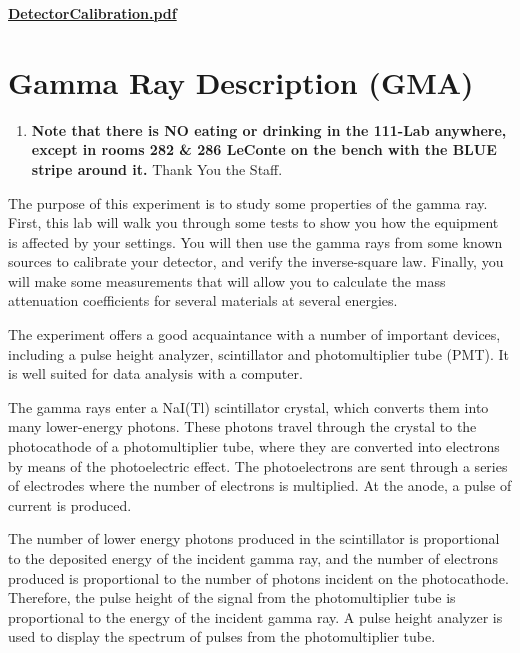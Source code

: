 \documentclass{../lab}
\begin{document}
\maketitle

\tableofcontents

\vspace{1em}

\href{https://berkeley-physics111b.github.io/assets/pdf/oldwebsitestructure/images/DetectorCalibration.pdf}{\textbf{DetectorCalibration.pdf}}

\section{Gamma Ray Description (GMA)}

\begin{enumerate}
    \item \textbf{Note that there is NO eating or drinking in the 111-Lab anywhere, except in rooms 282 \& 286 LeConte on the bench with the BLUE stripe around it.} Thank You the Staff.
\end{enumerate}

The purpose of this experiment is to study some properties of the gamma ray. First, this lab will walk you through some tests to show you how the equipment is affected by your settings. You will then use the gamma rays from some known sources to calibrate your detector, and verify the inverse-square law. Finally, you will make some measurements that will allow you to calculate the mass attenuation coefficients for several materials at several energies.

The experiment offers a good acquaintance with a number of important devices, including a pulse height analyzer, scintillator and photomultiplier tube (PMT). It is well suited for data analysis with a computer.

The gamma rays enter a NaI(Tl) scintillator crystal, which converts them into many lower-energy photons. These photons travel through the crystal to the photocathode of a photomultiplier tube, where they are converted into electrons by means of the photoelectric effect. The photoelectrons are sent through a series of electrodes where the number of electrons is multiplied. At the anode, a pulse of current is produced.

The number of lower energy photons produced in the scintillator is proportional to the deposited energy of the incident gamma ray, and the number of electrons produced is proportional to the number of photons incident on the photocathode. Therefore, the pulse height of the signal from the photomultiplier tube is proportional to the energy of the incident gamma ray. A pulse height analyzer is used to display the spectrum of pulses from the photomultiplier tube.
\end{document}
